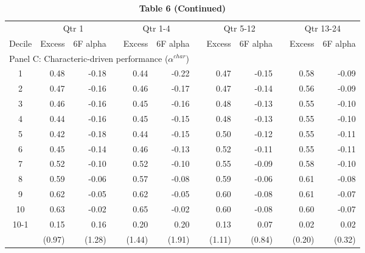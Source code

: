 \begin{singlespacing}
\begin{table}[H]
\small
\centering
{\captionsetup{justification=centering,singlelinecheck=off}
\caption*{ \bfseries Table 6 (Continued) }}
\label{my-label}
\begin{tabular}{crrrrrrrrrrr}
\hline
      & \multicolumn{2}{c}{Qtr 1} &  & \multicolumn{2}{c}{Qtr 1-4} &  & \multicolumn{2}{c}{Qtr 5-12} &  & \multicolumn{2}{c}{Qtr 13-24} \\ \cline{2-3} \cline{5-6} \cline{8-9} \cline{11-12} 
Decile & Excess     & 6F alpha     &  & Excess      & 6F alpha      &  & Excess       & 6F alpha      &  & Excess       & 6F alpha       \\ \hline
\multicolumn{12}{l}{Panel C: Characteric-driven performance ($\alpha^{char}$)}                                                                       \\
1    & 0.48   & -0.18  &  & 0.44   & -0.22  &  & 0.47   & -0.15  &  & 0.58   & -0.09  \\
2    & 0.47   & -0.16  &  & 0.46   & -0.17  &  & 0.47   & -0.14  &  & 0.56   & -0.09  \\
3    & 0.46   & -0.16  &  & 0.45   & -0.16  &  & 0.48   & -0.13  &  & 0.55   & -0.10  \\
4    & 0.44   & -0.16  &  & 0.45   & -0.15  &  & 0.48   & -0.13  &  & 0.55   & -0.10  \\
5    & 0.42   & -0.18  &  & 0.44   & -0.15  &  & 0.50   & -0.12  &  & 0.55   & -0.11  \\
6    & 0.45   & -0.14  &  & 0.46   & -0.13  &  & 0.52   & -0.11  &  & 0.55   & -0.11  \\
7    & 0.52   & -0.10  &  & 0.52   & -0.10  &  & 0.55   & -0.09  &  & 0.58   & -0.10  \\
8    & 0.59   & -0.06  &  & 0.57   & -0.08  &  & 0.59   & -0.06  &  & 0.61   & -0.08  \\
9    & 0.62   & -0.05  &  & 0.62   & -0.05  &  & 0.60   & -0.08  &  & 0.61   & -0.07  \\
10   & 0.63   & -0.02  &  & 0.65   & -0.02  &  & 0.60   & -0.08  &  & 0.60   & -0.07  \\
10-1 & 0.15   & 0.16   &  & 0.20   & 0.20   &  & 0.13   & 0.07   &  & 0.02   & 0.02   \\
     & (0.97) & (1.28) &  & (1.44) & (1.91) &  & (1.11) & (0.84) &  & (0.20) & (0.32)        \\ \hline
\end{tabular}
\end{table}
\end{singlespacing}

